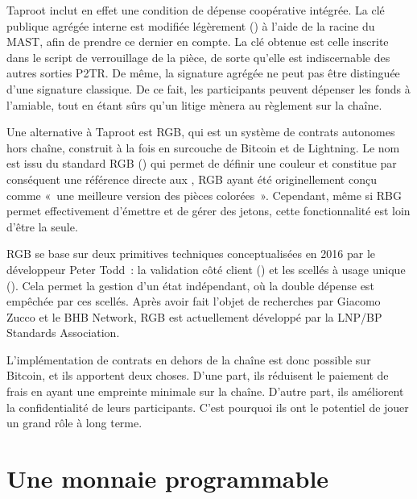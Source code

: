 Taproot inclut en effet une condition de dépense coopérative intégrée. La clé publique agrégée interne est modifiée légèrement () à l'aide de la racine du MAST, afin de prendre ce dernier en compte. La clé obtenue est celle inscrite dans le script de verrouillage de la pièce, de sorte qu'elle est indiscernable des autres sorties P2TR. De même, la signature agrégée ne peut pas être distinguée d'une signature classique. De ce fait, les participants peuvent dépenser les fonds à l'amiable, tout en étant sûrs qu'un litige mènera au règlement sur la chaîne. %

Une alternative à Taproot est RGB, qui est un système de contrats autonomes hors chaîne, construit à la fois en surcouche de Bitcoin et de Lightning. Le nom est issu du standard RGB () qui permet de définir une couleur et constitue par conséquent une référence directe aux , RGB ayant été originellement conçu comme «~une meilleure version des pièces colorées~». Cependant, même si RBG permet effectivement d'émettre et de gérer des jetons, cette fonctionnalité est loin d'être la seule.

RGB se base sur deux primitives techniques conceptualisées en 2016 par le développeur Peter Todd~: la validation côté client () et les scellés à usage unique (). Cela permet la gestion d'un état indépendant, où la double dépense est empêchée par ces scellés. Après avoir fait l'objet de recherches par Giacomo Zucco et le BHB Network, RGB est actuellement développé par la LNP/BP Standards Association.

L'implémentation de contrats en dehors de la chaîne est donc possible sur Bitcoin, et ils apportent deux choses. D'une part, ils réduisent le paiement de frais en ayant une empreinte minimale sur la chaîne. D'autre part, ils améliorent la confidentialité de leurs participants. C'est pourquoi ils ont le potentiel de jouer un grand rôle à long terme.

\section*{Une monnaie programmable}

